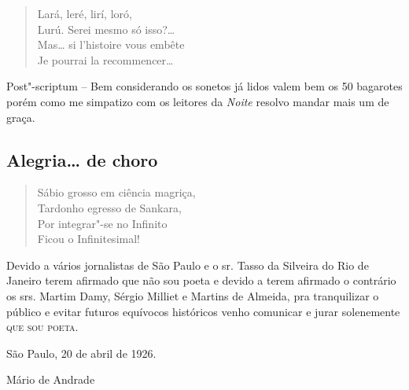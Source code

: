 \begin{verse}
Lará, leré, lirí, loró,\\
Lurú. Serei mesmo só isso?\ldots{}\\
Mas\ldots{} si l'histoire vous embête\\
Je pourrai la recommencer\ldots{}
\end{verse}

\parbox{\textwidth}{
Post"-scriptum -- Bem considerando os sonetos já lidos valem bem os 50
bagarotes porém como me simpatizo com os leitores da \emph{Noite}
resolvo mandar mais um de graça.}


\bigskip
\section*{Alegria\ldots{} de choro}

\begin{verse}
Sábio grosso em ciência magriça,\\
Tardonho egresso de Sankara,\\
Por integrar"-se no Infinito\\
Ficou o Infinitesimal!
\end{verse}


\medskip

\begingroup\centering\parbox{165pt}{
Devido a vários jornalistas de São Paulo e o sr. Tasso da Silveira do
Rio de Janeiro terem afirmado que não sou poeta e devido a terem
afirmado o contrário os srs. Martim Damy, Sérgio Milliet e Martins de
Almeida, pra tranquilizar o público e evitar futuros equívocos
históricos venho comunicar e jurar solenemente \textsc{que sou poeta.}

\hfill{}São Paulo, 20 de abril de 1926.

\hfill{}Mário de Andrade}\endgroup

\chapter[«A morte que ri!\ldots{}»\medskip]{}

